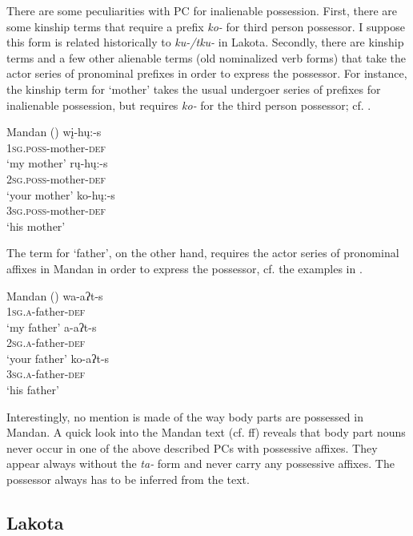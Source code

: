 \documentclass[output=paper]{LSP/langsci}
\begin{document}
There are some peculiarities with PC for inalienable possession. First, there are some kinship terms that require a prefix \textit{ko-} for third person possessor. I suppose this form is related historically to \textit{ku-/tku-} in Lakota. Secondly, there are kinship terms and a few other alienable terms (old nominalized verb forms) that take the actor series of pronominal prefixes in order to express the possessor. For instance, the kinship term for `mother' takes the usual undergoer series of prefixes for inalienable possession, but requires \textit{ko-} for the third person possessor; cf. . 

\ea Mandan (\citealt[45]{Mixco1997}) \label{mandanmother}
\ea
\gll wį-hų:-s \\			
\textsc{1sg.poss}-mother-\textsc{def} \\
\glt `my mother'
\ex \gll rų-hų:-s \\
\textsc{2sg.poss}-mother-\textsc{def} \\
\glt `your mother'
\ex \gll ko-hų:-s \\
\textsc{3sg.poss}-mother-\textsc{def} \\
\glt `his mother'
\z \z

The term for `father', on the other hand, requires the actor series of pronominal affixes in Mandan in order to express the possessor, cf. the examples in .

\ea Mandan (\citealt[45]{Mixco1997}) \label{mandanfather}
\ea \gll wa-aʔt-s \\
\textsc{1sg.a}-father-\textsc{def} \\
\glt `my father'
\ex \gll a-aʔt-s \\
\textsc{2sg.a}-father-\textsc{def} \\
\glt `your father'
\ex \gll ko-aʔt-s \\
\textsc{3sg.a}-father-\textsc{def} \\
\glt `his father'
\z \z

Interestingly, no mention is made of the way body parts are possessed in Mandan. A quick look into the Mandan text (cf. \citealt[66]{Mixco1997}ff) reveals that body part nouns never occur in one of the above described PCs with possessive affixes. They appear always without the \textit{ta-} form and never carry any possessive affixes. The possessor always has to be inferred from the text.

\subsection{Lakota}
\end{document}

